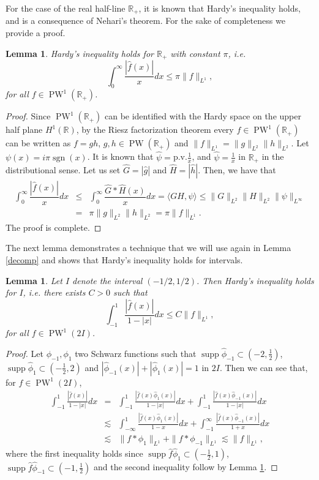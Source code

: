 \documentclass[footinclude=true]{amsart}
\theoremstyle{plain}
\newtheorem{lm}[theo]{Lemma}
\DeclareMathOperator{\PW}{PW}
\DeclareMathOperator{\supp}{supp}
\DeclareMathOperator{\sgn}{sgn}
\begin{document}
    For the case of the real half-line $\mathbb{R}_{+}$, it is known that Hardy's inequality holds, and is a consequence of Nehari's theorem. For the sake of completeness we provide a proof.
    \begin{lm}\label{Hardy}
    	Hardy's inequality holds for $\mathbb{R}_{+}$ with constant $\pi$, i.e. $$\int_{0}^{\infty}\dfrac{|\widehat{f}(x)|}{x}dx\leq \pi\|f\|_{L^{1}},$$
    	for all $f\in\PW^{1}(\mathbb{R}_{+})$.
    \end{lm}
\begin{proof}
	Since $\PW^1(\mathbb{R}_{+})$ can be identified with the Hardy space on the upper half plane $H^1(\mathbb{R})$, by the Riesz factorization theorem every $f\in\PW^1(\mathbb{R}_{+})$ can be written as $f=gh$, $g,h\in\PW(\mathbb{R}_{+})$ and $\|f\|_{L^1}=\|g\|_{L^2}\|h\|_{L^2}$. Let $\psi(x)=i\pi\sgn(x)$. It is known that $\widehat{\psi}=$p.v.$\frac{1}{x}$, and $\widehat{\psi}=\frac{1}{x}$ in $\mathbb{R}_{+}$ in the distributional sense. Let us set $\widehat{G}=|\widehat{g}|$ and $\widehat{H}=|\widehat{h}|$. Then, we have that
	\begin{eqnarray}
		\int_{0}^{\infty}\dfrac{|\widehat{f}(x)|}{x}dx&\leq& 	\int_{0}^{\infty}\dfrac{\widehat{G}\ast \widehat{H}(x)}{x}dx=\langle GH,\psi\rangle \leq \|G\|_{L^2}\|H\|_{L^2}\|\psi\|_{L^{\infty}} \nonumber \\
		&=& \pi\|g\|_{L^2}\|h\|_{L^2}=\pi\|f\|_{L^1}. \nonumber 
	\end{eqnarray} 
The proof is complete.
\end{proof}
 The next lemma demonstrates a technique that we will use again in Lemma \ref{decomp} and shows that Hardy's inequality holds for intervals.
	\begin{lm}\label{interval}
		Let $I$ denote the interval $(-1/2,1/2)$. Then Hardy's inequality holds for $I$, i.e. there exists $C>0$ such that
		$$\int_{-1}^{1}\dfrac{|\widehat{f}(x)|}{1-|x|}dx\leq C\|f\|_{L^1},$$ for all $f\in \PW^1(2I)$.
	\end{lm}
	\begin{proof}
		Let $\phi_{-1},\phi_{1}$ two Schwarz functions such that $\supp\widehat{\phi}_{-1}\subset (-2,\frac{1}{2})$, $\supp\widehat{\phi}_{1}\subset (-\frac{1}{2},2)$ and $|\widehat{\phi}_{-1}(x)|+|\widehat{\phi}_{1}(x)|=1$ in $2I$. Then we can see that, for $f\in \PW^{1}(2I)$, 
		\begin{eqnarray}
			\int_{-1}^{1}\frac{|\widehat{f}(x)|}{1-|x|}dx&=& \int_{-1}^{1}\frac{|\widehat{f}(x)\widehat{\phi}_{1}(x)|}{1-|x|}dx+\int_{-1}^{1}\frac{|\widehat{f}(x)\widehat{\phi}_{-1}(x)|}{1-|x|}dx \nonumber \\
			&\lesssim& \int_{-\infty}^{1}\frac{|\widehat{f}(x)\widehat{\phi}_{1}(x)|}{1-x}dx+\int_{-1}^{\infty}\frac{|\widehat{f}(x)\widehat{\phi}_{-1}(x)|}{1+x}dx \nonumber \\
			&\lesssim& \|f\ast\phi_{1}\|_{L^{1}}+\|f\ast\phi_{-1}\|_{L^{1}}\lesssim \|f\|_{L^{1}}, \nonumber
		\end{eqnarray} 
		where the first inequality holds since $\supp\widehat{f}\widehat{\phi}_{1}\subset (-\frac{1}{2},1)$, $\supp\widehat{f}\widehat{\phi}_{-1}\subset (-1,\frac{1}{2})$ and the second inequality follow by Lemma \ref{Hardy}. 
	\end{proof}
\end{document}
